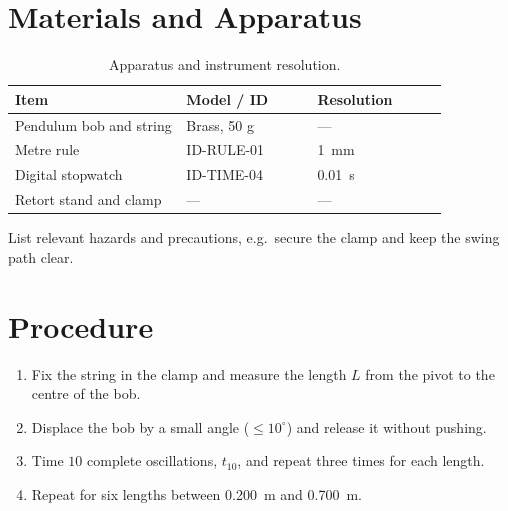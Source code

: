 \documentclass[12pt,a4paper]{article}
\newcommand{\ph}[1]{\textcolor{lpPlaceholder}{#1}}
\newcommand{\tblsetup}{\small\renewcommand{\arraystretch}{1.22}\arrayrulecolor{lpRule}}
\newcommand{\hdr}[1]{{\lpHeadingFont\bfseries\footnotesize #1}}
\begin{document}
\section{Materials and Apparatus}
\begin{table}[H]
  \centering
  \caption{Apparatus and instrument resolution.}
  \label{tab:apparatus}
  \tblsetup
  \begin{tabular}{@{}p{0.34\linewidth}p{0.26\linewidth}p{0.26\linewidth}@{}}
    \toprule\rowcolor{lpTableHead}
    \hdr{Item} & \hdr{Model / ID} & \hdr{Resolution} \\
    \midrule
    \ph{Pendulum bob and string} & \ph{Brass, 50 g}     & ---                      \\
    \ph{Metre rule}              & \ph{ID-RULE-01}      & \ph{\SI{1}{\milli\metre}} \\
    \ph{Digital stopwatch}       & \ph{ID-TIME-04}      & \ph{\SI{0.01}{\second}}   \\
    \ph{Retort stand and clamp}  & ---                  & ---                      \\
    \bottomrule
  \end{tabular}
\end{table}

\begin{caution}
  \ph{List relevant hazards and precautions, e.g.\ secure the clamp and keep the swing path clear.}
\end{caution}

\section{Procedure}
\begin{enumerate}
  \item \ph{Fix the string in the clamp and measure the length $L$ from the pivot to the centre of the bob.}
  \item \ph{Displace the bob by a small angle ($\leq 10^{\circ}$) and release it without pushing.}
  \item \ph{Time $10$ complete oscillations, $t_{10}$, and repeat three times for each length.}
  \item \ph{Repeat for six lengths between \SI{0.200}{\metre} and \SI{0.700}{\metre}.}
\end{enumerate}

\end{document}
